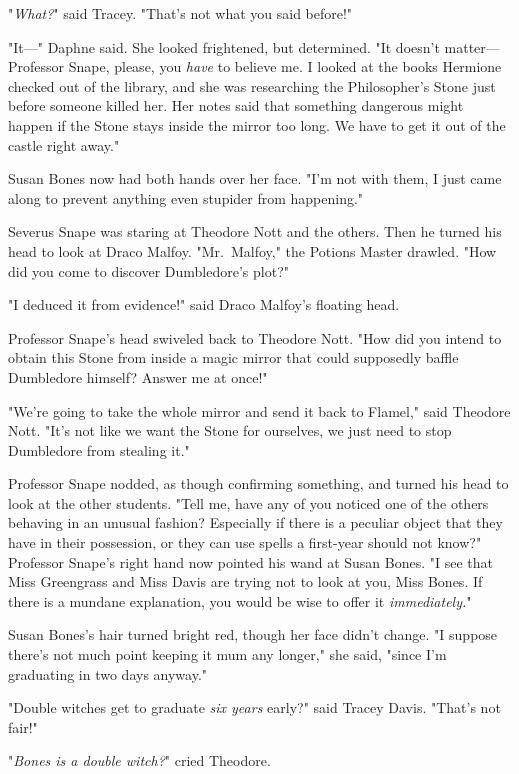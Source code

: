 "\emph{What?}" said Tracey. "That's not what you said before!"

"It---" Daphne said. She looked frightened, but determined. "It doesn't 
matter---Professor Snape, please, you \emph{have} to believe me. I looked at 
the books Hermione checked out of the library, and she was researching the 
Philosopher's Stone just before someone killed her. Her notes said that 
something dangerous might happen if the Stone stays inside the mirror too long. 
We have to get it out of the castle right away."

Susan Bones now had both hands over her face. "I'm not with them, I just came 
along to prevent anything even stupider from happening."

Severus Snape was staring at Theodore Nott and the others. Then he turned his 
head to look at Draco Malfoy. "Mr.~Malfoy," the Potions Master drawled. "How 
did you come to discover Dumbledore's plot?"

"I deduced it from evidence!" said Draco Malfoy's floating head.

Professor Snape's head swiveled back to Theodore Nott. "How did you intend to 
obtain this Stone from inside a magic mirror that could supposedly baffle 
Dumbledore himself? Answer me at once!"

"We're going to take the whole mirror and send it back to Flamel," said 
Theodore Nott. "It's not like we want the Stone for ourselves, we just need to 
stop Dumbledore from stealing it."

Professor Snape nodded, as though confirming something, and turned his head to 
look at the other students. "Tell me, have any of you noticed one of the others 
behaving in an unusual fashion? Especially if there is a peculiar object that 
they have in their possession, or they can use spells a first-year should not 
know?" Professor Snape's right hand now pointed his wand at Susan Bones. "I see 
that Miss Greengrass and Miss Davis are trying not to look at you, Miss Bones. 
If there is a mundane explanation, you would be wise to offer it 
\emph{immediately.}"

Susan Bones's hair turned bright red, though her face didn't change. "I suppose 
there's not much point keeping it mum any longer," she said, "since I'm 
graduating in two days anyway."

"Double witches get to graduate \emph{six years} early?" said Tracey Davis. 
"That's not fair!"

"\emph{Bones is a double witch?}" cried Theodore.

